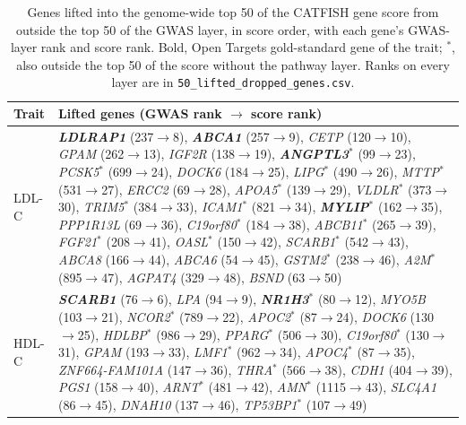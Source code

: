 \begin{table}[!htbp]
\centering
\caption{Genes lifted into the genome-wide top 50 of the CATFISH gene score from outside the top 50 of the GWAS layer, in score order, with each gene's GWAS-layer rank and score rank. Bold, Open Targets gold-standard gene of the trait; $^\ast$, also outside the top 50 of the score without the pathway layer. Ranks on every layer are in \texttt{50\_lifted\_dropped\_genes.csv}.}
\label{tab:lifted_genes}
\footnotesize
\begin{tabular*}{\linewidth}{@{\extracolsep{\fill}}p{}>{\raggedright\arraybackslash}p{}}
\hline
\textbf{Trait} & \textbf{Lifted genes (GWAS rank $\rightarrow$ score rank)} \\
\hline
LDL-C & \textbf{\textit{LDLRAP1}} (237$\rightarrow$8), \textbf{\textit{ABCA1}} (257$\rightarrow$9), \textit{CETP} (120$\rightarrow$10), \textit{GPAM} (262$\rightarrow$13), \textit{IGF2R} (138$\rightarrow$19), \textbf{\textit{ANGPTL3}}$^\ast$ (99$\rightarrow$23), \textit{PCSK5}$^\ast$ (699$\rightarrow$24), \textit{DOCK6} (184$\rightarrow$25), \textit{LIPG}$^\ast$ (490$\rightarrow$26), \textit{MTTP}$^\ast$ (531$\rightarrow$27), \textit{ERCC2} (69$\rightarrow$28), \textit{APOA5}$^\ast$ (139$\rightarrow$29), \textit{VLDLR}$^\ast$ (373$\rightarrow$30), \textit{TRIM5}$^\ast$ (384$\rightarrow$33), \textit{ICAM1}$^\ast$ (821$\rightarrow$34), \textbf{\textit{MYLIP}}$^\ast$ (162$\rightarrow$35), \textit{PPP1R13L} (69$\rightarrow$36), \textit{C19orf80}$^\ast$ (184$\rightarrow$38), \textit{ABCB11}$^\ast$ (265$\rightarrow$39), \textit{FGF21}$^\ast$ (208$\rightarrow$41), \textit{OASL}$^\ast$ (150$\rightarrow$42), \textit{SCARB1}$^\ast$ (542$\rightarrow$43), \textit{ABCA8} (166$\rightarrow$44), \textit{ABCA6} (54$\rightarrow$45), \textit{GSTM2}$^\ast$ (238$\rightarrow$46), \textit{A2M}$^\ast$ (895$\rightarrow$47), \textit{AGPAT4} (329$\rightarrow$48), \textit{BSND} (63$\rightarrow$50) \\
HDL-C & \textbf{\textit{SCARB1}} (76$\rightarrow$6), \textit{LPA} (94$\rightarrow$9), \textbf{\textit{NR1H3}}$^\ast$ (80$\rightarrow$12), \textit{MYO5B} (103$\rightarrow$21), \textit{NCOR2}$^\ast$ (789$\rightarrow$22), \textit{APOC2}$^\ast$ (87$\rightarrow$24), \textit{DOCK6} (130$\rightarrow$25), \textit{HDLBP}$^\ast$ (986$\rightarrow$29), \textit{PPARG}$^\ast$ (506$\rightarrow$30), \textit{C19orf80}$^\ast$ (130$\rightarrow$31), \textit{GPAM} (193$\rightarrow$33), \textit{LMF1}$^\ast$ (962$\rightarrow$34), \textit{APOC4}$^\ast$ (87$\rightarrow$35), \textit{ZNF664-FAM101A} (147$\rightarrow$36), \textit{THRA}$^\ast$ (566$\rightarrow$38), \textit{CDH1} (404$\rightarrow$39), \textit{PGS1} (158$\rightarrow$40), \textit{ARNT}$^\ast$ (481$\rightarrow$42), \textit{AMN}$^\ast$ (1115$\rightarrow$43), \textit{SLC4A1} (86$\rightarrow$45), \textit{DNAH10} (137$\rightarrow$46), \textit{TP53BP1}$^\ast$ (107$\rightarrow$49) \\

\end{tabular*}
\end{table}
